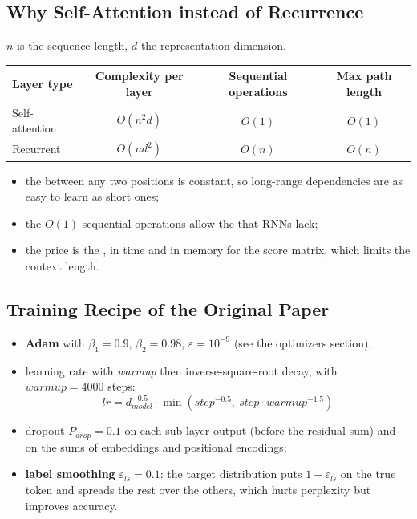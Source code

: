 \subsection{Why Self-Attention instead of Recurrence}
$n$ is the sequence length, $d$ the representation dimension.
\begin{center}
\begin{tabular}{|l|c|c|c|}
    \hline
    Layer type & Complexity per layer & Sequential operations & Max path length\\
    \hline
    Self-attention & $O(n^{2}d)$ & $O(1)$ & $O(1)$\\
    Recurrent & $O(nd^{2})$ & $O(n)$ & $O(n)$\\
    \hline
\end{tabular}
\end{center}
\begin{itemize}
    \item the  between any two positions is constant, so long-range
        dependencies are as easy to learn as short ones;
    \item the $O(1)$ sequential operations allow the  that
        RNNs lack;
    \item the price is the , in time and
        in memory for the score matrix, which limits the context length.
\end{itemize}

\subsection{Training Recipe of the Original Paper}
\begin{itemize}
    \item \textbf{Adam} with $\beta_{1}=0.9$, $\beta_{2}=0.98$, $\varepsilon=10^{-9}$ (see the
        optimizers section);
    \item learning rate with \emph{warmup} then inverse-square-root decay, with
        $warmup=4000$ steps:
        \[lr = d_{model}^{-0.5}\cdot\min\left(step^{-0.5},\ step\cdot warmup^{-1.5}\right)\]
    \item dropout $P_{drop}=0.1$ on each sub-layer output (before the residual sum) and on
        the sums of embeddings and positional encodings;
    \item \textbf{label smoothing} $\varepsilon_{ls}=0.1$: the target distribution puts
        $1-\varepsilon_{ls}$ on the true token and spreads the rest over the others, which
        hurts perplexity but improves accuracy.
\end{itemize}


